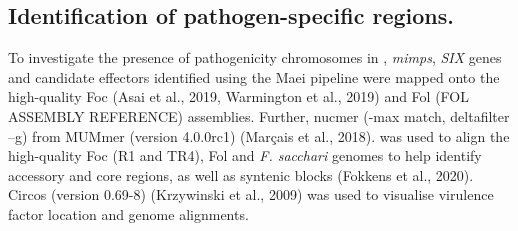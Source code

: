 \subsection{Identification of pathogen-specific regions.}
To investigate the presence of pathogenicity chromosomes in \Foc, \textit{mimps}, \textit{SIX} genes and candidate effectors identified using the Maei pipeline were mapped onto the high-quality Foc (Asai et al., 2019, Warmington et al., 2019) and Fol (FOL ASSEMBLY REFERENCE) assemblies. Further, nucmer (-max match, deltafilter –g) from MUMmer (version 4.0.0rc1) (Marçais et al., 2018). was used to align the high-quality Foc (R1 and TR4), Fol and \textit{F. sacchari} genomes to help identify accessory and core regions, as well as syntenic blocks (Fokkens et al., 2020). Circos (version 0.69-8) (Krzywinski et al., 2009) was used to visualise virulence factor location and genome alignments. 